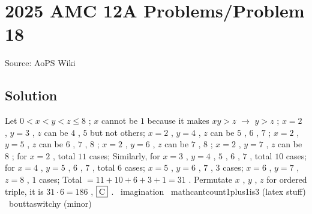 \documentclass[12pt]{article}
\begin{document}
\section*{{2025 AMC 12A Problems/Problem 18}}
Source: AoPS Wiki

\subsection*{Solution}
Let $0<x<y<z \le 8$ ; $x$ cannot be $1$ because it makes $xy>z$ $\rightarrow$ $y>z$ ; $x=2$ , $y=3$ , $z$ can be $4$ , $5$ but not others; $x=2$ , $y=4$ , $z$ can be $5$ , $6$ , $7$ ; $x=2$ , $y=5$ , $z$ can be $6$ , $7$ , $8$ ; $x=2$ , $y=6$ , $z$ can be $7$ , $8$ ; $x=2$ , $y=7$ , $z$ can be $8$ ;
for $x=2$ , total $11$ cases; Similarly, for $x=3$ , $y=4$ , $5$ , $6$ , $7$ , total $10$ cases; for $x=4$ , $y=5$ , $6$ , $7$ , total $6$ cases; $x=5$ , $y=6$ , $7$ , $3$ cases; $x=6$ , $y=7$ , $z=8$ , $1$ cases; Total $= 11 + 10 + 6 + 3 + 1 = 31$ . Permutate $x$ , $y$ , $z$ for ordered triple, it is $31 \cdot 6=186$ , $\fbox{C}$ . ~imagination ~mathcantcount1plus1is3 (latex stuff) ~bouttaswitchy (minor)
\end{document}
